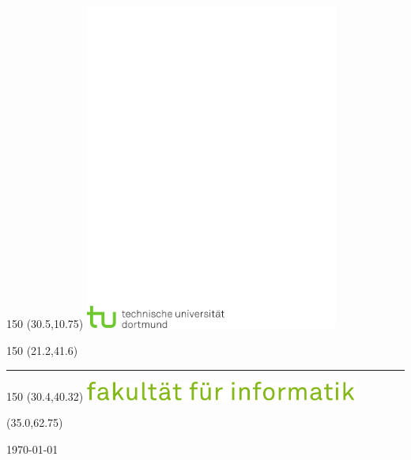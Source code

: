 \begin{titlepage}

\begin{textblock}{150} (30.5,10.75)
\includegraphics[width=83.25mm]{bilder/tu_logo.pdf}
\end{textblock}

\begin{textblock}{150} (21.2,41.6)
{\color{red}\rule{5mm}{5mm}}
\end{textblock}

\begin{textblock}{150} (30.4,40.32)
\includegraphics[width=90mm]{bilder/fi_text.pdf}
\end{textblock}

\begin{textblock}{80} (35.0,62.75)
  \vfill
  \begin{center}
    \fontsize{24pt}{24pt}
    \textsf \Arbeitsbezeichnung{}
    \vspace{1cm}

    \begin{onehalfspace}
      \fontsize{18pt}{18pt}
      \textsf \Arbeitstitel{}
    \end{onehalfspace}

    \vspace{12mm}

    \begin{onehalfspace}
      {\fontsize{14pt}{14pt}
      \textsf \Autor{}
      \textsf \today}
    \end{onehalfspace}
  \end{center}
  \vfill
\end{textblock}


\end{titlepage}
